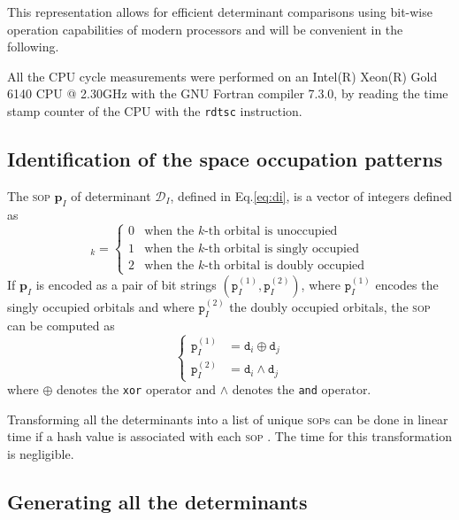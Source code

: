 \documentclass[aip,jcp,reprint,showkeys]{revtex4-1}
\newcommand{\md}{\mathtt{d}}
\newcommand{\mD}{\mathcal{D}}
\newcommand{\mpp}{\mathtt{p}}
\newcommand{\mpv}{\mathbf{p}}
\newcommand{\sop}{\textsc{sop}}
\begin{document}
This representation allows for efficient determinant comparisons using bit-wise operation 
capabilities of modern processors\cite{Scemama_2013} and will be convenient in the following.

All the CPU cycle measurements were performed on an Intel(R) Xeon(R)
Gold 6140 CPU @ 2.30GHz with the GNU Fortran compiler 7.3.0, by reading
the time stamp counter of the CPU with the \texttt{rdtsc} instruction.


\subsection{Identification of the space occupation patterns}

The {\sop} $\mpv_I$ of determinant $\mD_I$, 
defined in Eq.\eqref{eq:di},
is a vector of integers defined as
\begin{equation}
  [\mpv_I]_k = 
  \begin{cases} 
    0 & \text{when the $k$-th orbital is unoccupied} \\
    1 & \text{when the $k$-th orbital is singly occupied} \\
    2 & \text{when the $k$-th orbital is doubly occupied}
  \end{cases} 
\end{equation}
If $\mpv_I$ is encoded as a pair of bit strings $(\mpp_I^{(1)}, \mpp_I^{(2)})$, where
$\mpp_I^{(1)}$ encodes the singly occupied orbitals and where $\mpp_I^{(2)}$ the doubly
occupied orbitals, the {\sop} can be computed as
\begin{equation}
\label{eq:sop}
\begin{cases}
  \mpp_I^{(1)} & = \md_i \oplus \md_j \\
  \mpp_I^{(2)} & = \md_i \wedge \md_j 
  \end{cases} 
\end{equation}
where $\oplus$ denotes the \texttt{xor} operator and $\wedge$ denotes the
\texttt{and} operator.

Transforming all the determinants into a list of unique \sop s can be done
in linear time if a hash value is associated with each \sop
.\cite{Bitton_1983} The time for this transformation is negligible.


\subsection{Generating all the determinants}
\end{document}
